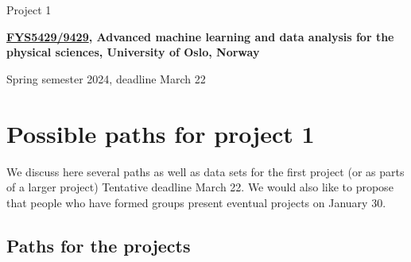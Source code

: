 \documentclass[%
oneside,                 %
final,                   %
10pt]{article}
\begin{document}

\newcommand{\exercisesection}[1]{\subsection*{#1}}






\thispagestyle{empty}

\begin{center}
{\LARGE\bf
\begin{spacing}{1.25}
Project 1
\end{spacing}
}
\end{center}


\begin{center}
{\bf \href{{https://www.uio.no/studier/emner/matnat/fys/FYS5429/index-eng.html}}{FYS5429/9429}, Advanced machine learning and data analysis for the physical sciences, University of Oslo, Norway${}^{}$} \\ [0mm]
\end{center}

\begin{center}
\end{center}
    

\begin{center}
Spring semester 2024, deadline March 22
\end{center}

\vspace{1cm}


\section{Possible paths for project 1}

We discuss here several paths as well as data sets for the first project (or as parts of a larger project)
Tentative deadline March 22. We would also like to propose that people who have formed groups present eventual projects on January 30. 

\subsection{Paths for the projects}
\end{document}
